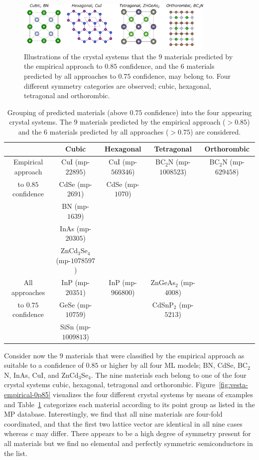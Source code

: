 \documentclass[superscriptaddress,unsortedaddress,
 amsmath,amssymb,
 aps,
]{revtex4-2}
\begin{document}
\begin{figure}[t]
    \centering
    \includegraphics[width=0.85\textwidth]{figures/vesta-images/fig6-all.png}
    \caption{Illustrations of the crystal systems that the $9$ materials predicted by the empirical approach to $0.85$ confidence, and the $6$ materials predicted by all approaches to $0.75$ confidence, may belong to.  Four different symmetry categories are observed; cubic, hexagonal, tetragonal and orthorombic.   }
    \label{fig:crystalsystems}
\end{figure}

\begin{table}[b]
    \centering 
    \caption{Grouping of predicted materials (above $0.75$ confidence) into the four appearing crystal systems. The $9$ materials predicted by the empirical approach ($>0.85$) and the $6$ materials predicted by all approaches ($>0.75$) are considered. }
    \begin{tabular}{c|c c c c}
      & Cubic & Hexagonal & Tetragonal & Orthorombic \\
    \hline 
    Empirical approach & CuI (mp-$22895$) & CuI (mp-$569346$) & BC$_2$N (mp-$1008523$) & BC$_2$N (mp-$629458$) \\
    to $0.85$ confidence & CdSe (mp-$2691$) & CdSe (mp-$1070$) & & \\
     & BN (mp-$1639$) & & & \\
     & InAs (mp-$20305$) & & & \\
     & ZnCd$_3$Se$_4$ (mp-$1078597$) & & & \\
    \hline 
    All approaches & InP (mp-$20351$) & InP (mp-$966800$) & ZnGeAs$_2$ (mp-$4008$) & \\ 
    to $0.75$ confidence & GeSe (mp-$10759$) & & CdSnP$_2$ (mp-$5213$) & \\ 
     & SiSn (mp-$1009813$) & & & \\
    \end{tabular}
    \label{tab:crystalsystems}
\end{table} 

Consider now the $9$ materials that were classified by the empirical approach as suitable to a confidence of $0.85$ or higher by all four ML models; BN, CdSe, BC$_2$N, InAs, CuI, and ZnCd$_3$Se$_4$. 
The nine materials each belong to one of the four crystal systems cubic, hexagonal, tetragonal and orthorombic.  Figure~\ref{fig:vesta-empirical-0p85} visualizes the four different crystal systems by means of examples and Table~\ref{tab:crystalsystems} categorizes each material according to its point group as listed in the MP database. 
Interestingly, we find that all nine materials are four-fold coordinated, and that the first two lattice vector are identical in all nine cases whereas $c$ may differ.  
There appears to be a high degree of symmetry present for all materials but we find no elemental and perfectly symmetric semiconductors in the list. 
\end{document}
